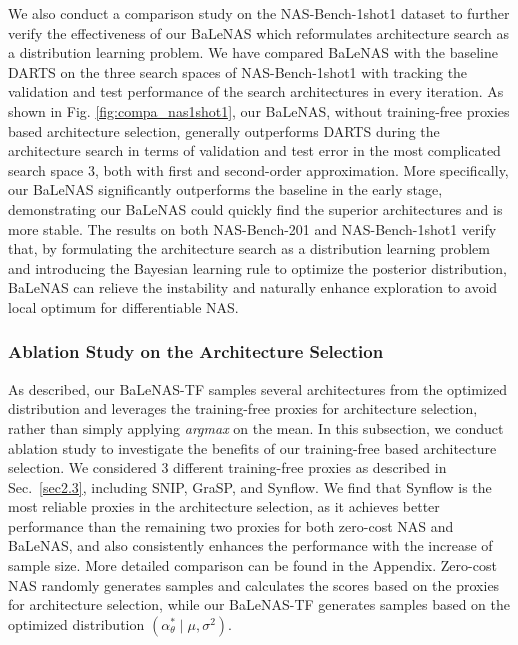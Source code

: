 \documentclass[10pt,twocolumn,letterpaper]{article}
\begin{document}
We also conduct a comparison study on the NAS-Bench-1shot1 dataset to further verify the effectiveness of our BaLeNAS which reformulates architecture search as a distribution learning problem. We have compared BaLeNAS with the baseline DARTS on the three search spaces of NAS-Bench-1shot1 with tracking the validation and test performance of the search architectures in every iteration. As shown in Fig. \ref{fig:compa_nas1shot1}, our BaLeNAS, without training-free proxies based architecture selection, generally outperforms DARTS during the architecture search in terms of validation and test error in the most complicated search space 3, both with first and second-order approximation. More specifically, our BaLeNAS significantly outperforms the baseline in the early stage, demonstrating our BaLeNAS could quickly find the superior architectures and is more stable. The results on both NAS-Bench-201 and NAS-Bench-1shot1 verify that, by formulating the architecture search as a distribution learning problem and introducing the Bayesian learning rule to optimize the posterior distribution, BaLeNAS can relieve the instability and naturally enhance exploration to avoid local optimum for differentiable NAS. 


\vspace{-1em}
\subsubsection{Ablation Study on the Architecture Selection}

As described, our BaLeNAS-TF samples several architectures from the optimized distribution and leverages the training-free proxies for architecture selection, rather than simply applying \textit{argmax} on the mean. In this subsection, we conduct ablation study to investigate the benefits of our training-free based architecture selection. We considered 3 different training-free proxies as described in Sec.~\ref{sec2.3}, including SNIP, GraSP, and Synflow. We find that Synflow is the most reliable proxies in the architecture selection, as it achieves better performance than the remaining two proxies for both zero-cost NAS and BaLeNAS, and also consistently enhances the performance with the increase of sample size. More detailed comparison can be found in the Appendix. Zero-cost NAS \cite{abdelfattah2021zero} randomly generates samples and calculates the scores based on the proxies for architecture selection, while our BaLeNAS-TF generates samples based on the optimized distribution $({\alpha_\theta^*} \mid \mu,\sigma^2)$. 
\end{document}
